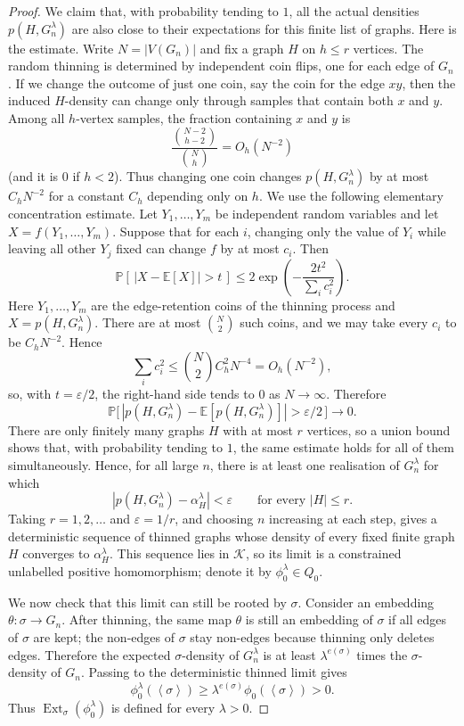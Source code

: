 \documentclass[11pt]{article}
\theoremstyle{definition}
\newcommand{\E}{\mathbb{E}}
\newcommand{\Prob}{\mathbb{P}}
\newcommand{\K}{\mathcal{K}}
\newcommand{\Ext}{\operatorname{Ext}}
\newcommand{\brak}[1]{\left\langle #1\right\rangle}
\newcommand{\eps}{\varepsilon}
\begin{document}
\begin{proof}
We claim that, with probability tending to $1$, all the actual densities
$p(H,G_n^\lambda)$ are also close to their expectations for this finite list of graphs.
Here is the estimate.  Write $N=|V(G_n)|$ and fix a graph $H$ on $h\le r$ vertices.  The
random thinning is determined by independent coin flips, one for each edge of $G_n$.  If
we change the outcome of just one coin, say the coin for the edge $xy$, then the induced
$H$-density can change only through samples that contain both $x$ and $y$.  Among all
$h$-vertex samples, the fraction containing $x$ and $y$ is
\[
  \frac{\binom{N-2}{h-2}}{\binom Nh}=O_h(N^{-2})
\]
(and it is $0$ if $h<2$).  Thus changing one coin changes $p(H,G_n^\lambda)$ by at most
$C_hN^{-2}$ for a constant $C_h$ depending only on $h$.  We use the following elementary
concentration estimate.  Let $Y_1,\ldots,Y_m$ be independent random variables and let
$X=f(Y_1,\ldots,Y_m)$.  Suppose that for each $i$, changing only the value of $Y_i$ while
leaving all other $Y_j$ fixed can change $f$ by at most $c_i$.  Then
\[
  \Prob[\,|X-\E[X]|>t\,]\le
  2\exp\left(-\frac{2t^2}{\sum_i c_i^2}\right).
\]
Here $Y_1,\ldots,Y_m$ are the edge-retention coins of the thinning process and
$X=p(H,G_n^\lambda)$.  There are at most $\binom N2$ such coins, and we may take every
$c_i$ to be $C_hN^{-2}$.  Hence
\[
  \sum_i c_i^2 \le \binom N2 C_h^2N^{-4}=O_h(N^{-2}),
\]
so, with $t=\eps/2$, the right-hand side tends to $0$ as $N\to\infty$.  Therefore
\[
  \Prob\bigl[\,|p(H,G_n^\lambda)-\E[p(H,G_n^\lambda)]|>\eps/2\,\bigr]\to0 .
\]
There are only finitely many graphs $H$ with at most $r$ vertices, so a union bound shows
that, with probability tending to $1$, the same estimate holds for all of them
simultaneously.  Hence, for all large $n$, there is at least one realisation of
$G_n^\lambda$ for which
\[
  |p(H,G_n^\lambda)-\alpha_H^\lambda|<\eps
  \qquad\text{for every } |H|\le r .
\]
Taking $r=1,2,\ldots$ and $\eps=1/r$, and choosing $n$ increasing at each step, gives a
deterministic sequence of thinned graphs whose density of every fixed finite graph $H$
converges to $\alpha_H^\lambda$.  This sequence lies in $\K$, so its limit is a
constrained unlabelled positive homomorphism; denote it by $\phi_0^\lambda\in Q_0$.

We now check that this limit can still be rooted by $\sigma$.  Consider an embedding
$\theta:\sigma\to G_n$.  After thinning, the same map $\theta$ is still an embedding of
$\sigma$ if all edges of $\sigma$ are kept; the non-edges of $\sigma$ stay non-edges
because thinning only deletes edges.  Therefore the expected $\sigma$-density of
$G_n^\lambda$ is at least
$\lambda^{e(\sigma)}$ times the $\sigma$-density of $G_n$.  Passing to the deterministic
thinned limit gives
\[
  \phi_0^\lambda(\brak\sigma)\ge
  \lambda^{e(\sigma)}\phi_0(\brak\sigma)>0.
\]
Thus $\Ext_\sigma(\phi_0^\lambda)$ is defined for every $\lambda>0$.


\end{proof}
\end{document}
